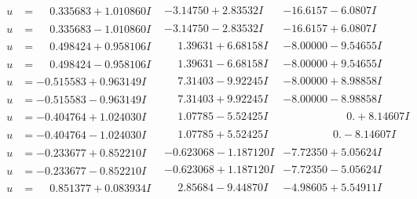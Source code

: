 \documentclass[1p]{elsarticle_modified}
\theoremstyle{definition}
\begin{document}
$$\begin{array}{c|c|c}
\begin{aligned}
u &= \phantom{-}0.335683 + 1.010860 I\end{aligned}
 & -3.14750 + 2.83532 I & -16.6157 - 6.0807 I \\ \hline\begin{aligned}
u &= \phantom{-}0.335683 - 1.010860 I\end{aligned}
 & -3.14750 - 2.83532 I & -16.6157 + 6.0807 I \\ \hline\begin{aligned}
u &= \phantom{-}0.498424 + 0.958106 I\end{aligned}
 & \phantom{-}1.39631 + 6.68158 I & -8.00000 - 9.54655 I \\ \hline\begin{aligned}
u &= \phantom{-}0.498424 - 0.958106 I\end{aligned}
 & \phantom{-}1.39631 - 6.68158 I & -8.00000 + 9.54655 I \\ \hline\begin{aligned}
u &= -0.515583 + 0.963149 I\end{aligned}
 & \phantom{-}7.31403 - 9.92245 I & -8.00000 + 8.98858 I \\ \hline\begin{aligned}
u &= -0.515583 - 0.963149 I\end{aligned}
 & \phantom{-}7.31403 + 9.92245 I & -8.00000 - 8.98858 I \\ \hline\begin{aligned}
u &= -0.404764 + 1.024030 I\end{aligned}
 & \phantom{-}1.07785 - 5.52425 I & \phantom{-0.000000 -}0. + 8.14607 I \\ \hline\begin{aligned}
u &= -0.404764 - 1.024030 I\end{aligned}
 & \phantom{-}1.07785 + 5.52425 I & \phantom{-0.000000 } 0. - 8.14607 I \\ \hline\begin{aligned}
u &= -0.233677 + 0.852210 I\end{aligned}
 & -0.623068 - 1.187120 I & -7.72350 + 5.05624 I \\ \hline\begin{aligned}
u &= -0.233677 - 0.852210 I\end{aligned}
 & -0.623068 + 1.187120 I & -7.72350 - 5.05624 I \\ \hline\begin{aligned}
u &= \phantom{-}0.851377 + 0.083934 I\end{aligned}
 & \phantom{-}2.85684 - 9.44870 I & -4.98605 + 5.54911 I \\ \hline\begin{aligned}

\end{aligned}
\end{array}$$
\end{document}

